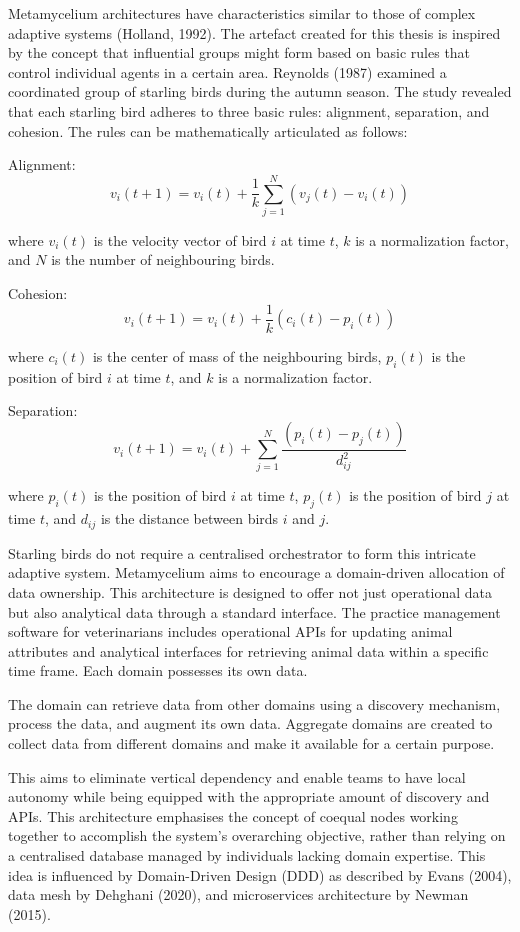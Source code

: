 \documentclass[preprint,12pt]{elsarticle}
\begin{document}
Metamycelium architectures have characteristics similar to those of complex adaptive systems (Holland, 1992). The artefact created for this thesis is inspired by the concept that influential groups might form based on basic rules that control individual agents in a certain area. Reynolds (1987) examined a coordinated group of starling birds during the autumn season. The study revealed that each starling bird adheres to three basic rules: alignment, separation, and cohesion. The rules can be mathematically articulated as follows:

Alignment:
$$
v_i(t+1) = v_i(t) + \frac{1}{k} \sum_{j=1}^{N} (v_j(t) - v_i(t))
$$

where $v_i(t)$ is the velocity vector of bird $i$ at time $t$, $k$ is a normalization factor, and $N$ is the number of neighbouring birds.

Cohesion:
$$
v_i(t+1) = v_i(t) + \frac{1}{k} (c_i(t) - p_i(t))
$$

where $c_i(t)$ is the center of mass of the neighbouring birds, $p_i(t)$ is the position of bird $i$ at time $t$, and $k$ is a normalization factor.

Separation:
$$
v_i(t+1) = v_i(t) + \sum_{j=1}^{N} \frac{(p_i(t) - p_j(t))}{d_{ij}^2}
$$

where $p_i(t)$ is the position of bird $i$ at time $t$, $p_j(t)$ is the position of bird $j$ at time $t$, and $d_{ij}$ is the distance between birds $i$ and $j$.

Starling birds do not require a centralised orchestrator to form this intricate adaptive system. Metamycelium aims to encourage a domain-driven allocation of data ownership. This architecture is designed to offer not just operational data but also analytical data through a standard interface. The practice management software for veterinarians includes operational APIs for updating animal attributes and analytical interfaces for retrieving animal data within a specific time frame. Each domain possesses its own data.

The domain can retrieve data from other domains using a discovery mechanism, process the data, and augment its own data. Aggregate domains are created to collect data from different domains and make it available for a certain purpose. 

This aims to eliminate vertical dependency and enable teams to have local autonomy while being equipped with the appropriate amount of discovery and APIs. This architecture emphasises the concept of coequal nodes working together to accomplish the system's overarching objective, rather than relying on a centralised database managed by individuals lacking domain expertise. This idea is influenced by Domain-Driven Design (DDD) as described by Evans (2004), data mesh by Dehghani (2020), and microservices architecture by Newman (2015).
\end{document}
